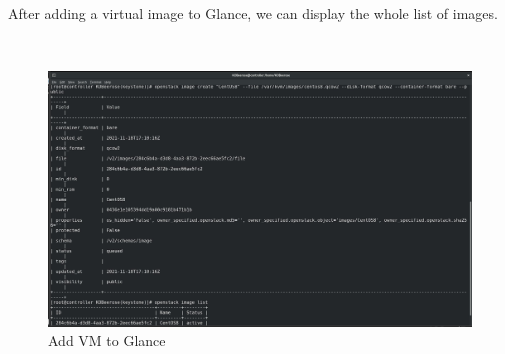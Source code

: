 \begin{spacing}{1.2}
\par After adding a virtual image to Glance, we can display the whole list of images. 

\\
\begin{figure}[!htb] 
\begin{center} 
\includegraphics[width=1\linewidth]{Cloud/Add Virtual Machine Images/Add VM Images/Add VM to Glance} 
\end{center} 
\caption{Add VM to Glance} 
\end{figure}  \FloatBarrier
\\
\end{spacing}